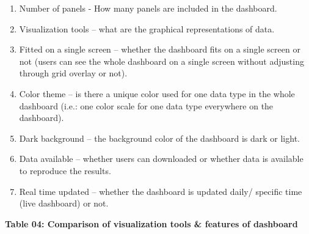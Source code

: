 \documentclass[
]{article}
\providecommand{\tightlist}{%
  \setlength{\itemsep}{0pt}\setlength{\parskip}{0pt}}
\begin{document}
\begin{enumerate}
\def\labelenumi{\roman{enumi}.}
\tightlist
\item
  Number of panels - How many panels are included in the dashboard.
\item
  Visualization tools -- what are the graphical representations of data.
\item
  Fitted on a single screen -- whether the dashboard fits on a single
  screen or not (users can see the whole dashboard on a single screen
  without adjusting through grid overlay or not).
\item
  Color theme -- is there a unique color used for one data type in the
  whole dashboard (i.e.: one color scale for one data type everywhere on
  the dashboard).
\item
  Dark background -- the background color of the dashboard is dark or
  light.
\item
  Data available -- whether users can downloaded or whether data is
  available to reproduce the results.
\item
  Real time updated -- whether the dashboard is updated daily/ specific
  time (live dashboard) or not.
\end{enumerate}

\textbf{Table 04: Comparison of visualization tools \& features of
dashboard}
\end{document}
